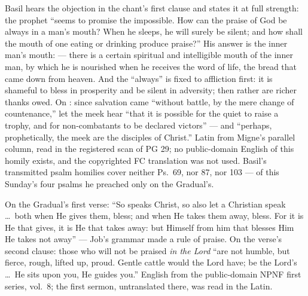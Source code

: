 \begin{witnessnote}
Basil hears the objection in the chant's first clause and states it at full
strength: the prophet ``seems to promise the impossible. How can the praise
of God be always in a man's mouth? When he sleeps, he will surely be silent;
and how shall the mouth of one eating or drinking produce praise?'' His
answer is the inner man's mouth:  --- there is a certain spiritual and
intelligible mouth of the inner man, by which he is nourished when he
receives the word of life, the bread that came down from heaven. And the
``always'' is fixed to affliction first: it is shameful to bless in
prosperity and be silent in adversity; then rather are richer thanks owed.
On : since salvation came ``without battle, by the
mere change of countenance,'' let the meek hear ``that it is possible for
the quiet to raise a trophy, and for non-combatants to be declared victors''
--- and ``perhaps, prophetically, the meek are the disciples of Christ.''
Latin from Migne's parallel column, read in the registered scan of PG 29; no
public-domain English of this homily exists, and the copyrighted FC
translation was not used. Basil's transmitted psalm homilies cover neither Ps.\ 69, nor 87, nor 103 --- of
this Sunday's four psalms he preached only on the Gradual's.
\end{witnessnote}

\begin{witnessnote}
On the Gradual's first verse: ``So speaks Christ, so also let a Christian
speak \dots\ both when He gives them, bless; and when He takes them away,
bless. For it is He that gives, it is He that takes away: but Himself from
him that blesses Him He takes not away'' --- Job's grammar made a rule of
praise. On the verse's second clause: those who will not be praised
\textit{in the Lord} ``are not humble, but fierce, rough, lifted up, proud.
Gentle cattle would the Lord have; be the Lord's  \dots\ He
sits upon you, He guides you.'' English from the public-domain NPNF first
series, vol.~8; the first sermon, untranslated there, was read in the Latin.
\end{witnessnote}

